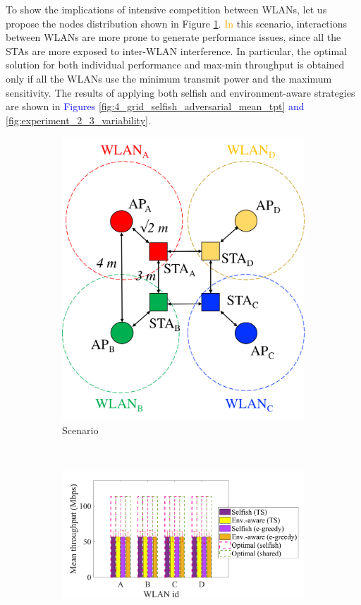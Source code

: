 \documentclass[preprint,12pt]{elsarticle}
\begin{document}
To show the implications of intensive competition between WLANs, let us propose the nodes distribution shown in Figure \ref{fig:adversarial_issues_scenario}. \textcolor{orange}{In} this scenario, interactions between WLANs are more prone to generate performance issues, since all the STAs are more exposed to inter-WLAN interference. In particular, the optimal solution for both individual performance and max-min throughput is obtained only if all the WLANs use the minimum transmit power and the maximum sensitivity. The results of applying both selfish and environment-aware strategies are shown in \textcolor{blue}{Figures \ref{fig:4_grid_selfish_adversarial_mean_tpt} and \ref{fig:experiment_2_3_variability}}. 
\begin{figure}[h!!!!]
	\centering
	\begin{subfigure}[b]{0.3\textwidth}
		\includegraphics[width=\textwidth]{s6_new}
		\caption{Scenario}
		\label{fig:adversarial_issues_scenario}
	\end{subfigure}\\
	\begin{subfigure}[b]{0.48\textwidth}
		\includegraphics[width=\textwidth]{fig_2_3_adversarial}

\end{subfigure}
\end{figure}
\end{document}
